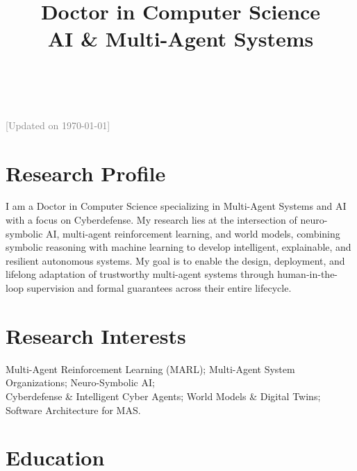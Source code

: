 \documentclass[11pt,a4paper,sans]{moderncv}
\title{Doctor in Computer Science \\ AI \& Multi-Agent Systems \\ \ \\}
\begin{document}
\makecvtitle

\vspace{-1cm}
\begin{center}
    {\tiny
        \noindent \textcolor{gray}{[Updated on \today]}}
\end{center}



\section{Research Profile}

I am a Doctor in Computer Science specializing in Multi-Agent Systems and AI with a focus on Cyberdefense. My research lies at the intersection of neuro-symbolic AI, multi-agent reinforcement learning, and world models, combining symbolic reasoning with machine learning to develop intelligent, explainable, and resilient autonomous systems. My goal is to enable the design, deployment, and lifelong adaptation of trustworthy multi-agent systems through human-in-the-loop supervision and formal guarantees across their entire lifecycle.


\section{Research Interests}
Multi-Agent Reinforcement Learning (MARL); Multi-Agent System Organizations; Neuro-Symbolic AI;\\
Cyberdefense \& Intelligent Cyber Agents; World Models \& Digital Twins; Software Architecture for MAS.


\section{Education}

\end{document}
